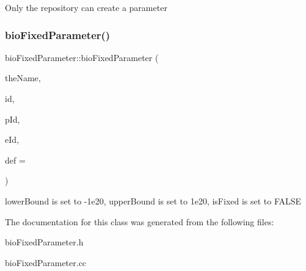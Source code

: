 Only the repository can create a parameter \mbox{\label{classbio_fixed_parameter_a132679ea6cf49e582159c64e8264a475}} 
\subsubsection{\texorpdfstring{bio\+Fixed\+Parameter()}{bioFixedParameter()}\hspace{0.1cm}{\footnotesize\ttfamily [2/2]}}
{\footnotesize\ttfamily bio\+Fixed\+Parameter\+::bio\+Fixed\+Parameter (\begin{DoxyParamCaption}\item[{pat\+String}]{the\+Name,  }\item[{pat\+U\+Long}]{id,  }\item[{pat\+U\+Long}]{p\+Id,  }\item[{pat\+U\+Long}]{e\+Id,  }\item[{pat\+Real}]{def = {} }\end{DoxyParamCaption})\hspace{0.3cm}{\ttfamily [protected]}}

lower\+Bound is set to -\/1e20, upper\+Bound is set to 1e20, is\+Fixed is set to F\+A\+L\+SE 

The documentation for this class was generated from the following files\+:\begin{DoxyCompactItemize}
\item 
bio\+Fixed\+Parameter.\+h\item 
bio\+Fixed\+Parameter.\+cc\end{DoxyCompactItemize}
